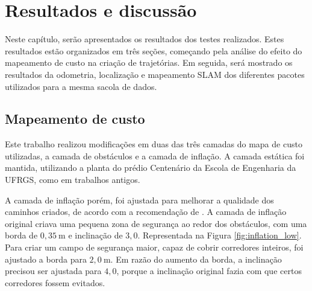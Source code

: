 \documentclass[repeatfields,xlists,xpacks,oneside,yearsonly]{ufrgscca}
\begin{document}
\chapter{Resultados e discussão}
\label{resultados}

Neste capítulo, serão apresentados os resultados dos testes realizados.
Estes resultados estão organizados em três seções, começando pela análise
do efeito do mapeamento de custo na criação de trajetórias.
Em seguida, será mostrado os resultados da odometria, localização e mapeamento
SLAM dos diferentes pacotes utilizados para a mesma sacola de dados.


\section{Mapeamento de custo}

Este trabalho realizou modificações em duas das três camadas do mapa de custo
utilizadas, a camada de obstáculos e a camada de inflação.
A camada estática foi mantida, utilizando a planta do prédio Centenário da
Escola de Engenharia da UFRGS, como em trabalhos antigos.

A camada de inflação porém, foi ajustada para melhorar a qualidade dos
caminhos criados, de acordo com a recomendação de \textcite{ros_tuning_guide}.
A camada de inflação original criava uma pequena zona de segurança ao redor
dos obstáculos, com uma borda de $0,35~\si{\meter}$ e inclinação de $3,0$.
Representada na Figura \ref{fig:inflation_low}.
Para criar um campo de segurança maior, capaz de cobrir corredores inteiros, 
foi ajustado a borda para $2,0~\si{\meter}$. 
Em razão do aumento da borda, a inclinação precisou ser ajustada para $4,0$, 
porque a inclinação original fazia com que certos corredores fossem evitados.
\end{document}
